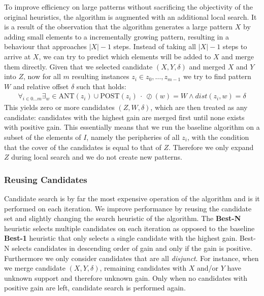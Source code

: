 \documentclass{llncs}
\begin{document}
To improve efficiency on large patterns without sacrificing the objectivity of the original heuristics, the algorithm is augmented with an additional local search. It is a result of the observation that the algorithm generates a large pattern $X$ by adding small elements to a incrementally growing pattern, resulting in a behaviour that approaches $|X|-1$ steps. Instead of taking all $|X|-1$ steps to arrive at $X$, we can try to predict which elements will be added to $X$ and merge them directly. Given that we selected candidate $(X,Y,\delta)$ and merged $X$ and $Y$ into $Z$, now for all $m$ resulting instances $z_i \in {z_0,\dots,z_{m-1}}$ we try to find pattern $W$ and relative offset $\delta$ such that holds:
\begin{align}
\label{floodfill}
\forall_{i\in 0\dots m} \exists_w \in \mathrm{ANT}(z_i) \cup \mathrm{POST}(z_i) \ \cdot \ \oslash(w) = W \land dist(z_i, w) = \delta 
\end{align}
\noindent This yields zero or more candidates $(Z,W,\delta)$, which are then treated as any candidate: candidates with the highest gain are merged first until none exists with positive gain. This essentially means that we run the baseline algorithm on a subset of the elements of $I$, namely the peripheries of all $z_i$, with the condition that the cover of the candidates is equal to that of $Z$. Therefore we only expand $Z$ during local search and we do not create new patterns. 

\subsubsection{Reusing Candidates}

Candidate search is by far the most expensive operation of the algorithm and is it performed on each iteration. We improve performance by reusing the candidate set and slightly changing the search heuristic of the algorithm. The 
\textbf{Best-N} heuristic selects multiple candidates on each iteration as opposed to the baseline \textbf{Best-1} heuristic that only selects a single candidate with the highest gain. Best-N selects candidates in descending order of gain and only if the gain is positive. Furthermore we only consider candidates that are all \emph{disjunct}. For instance, when we merge candidate $(X,Y,\delta)$, remaining candidates with $X$ and/or $Y$ have unknown support and therefore unknown gain. Only when no candidates with positive gain are left, candidate search is performed again.%
\end{document}

